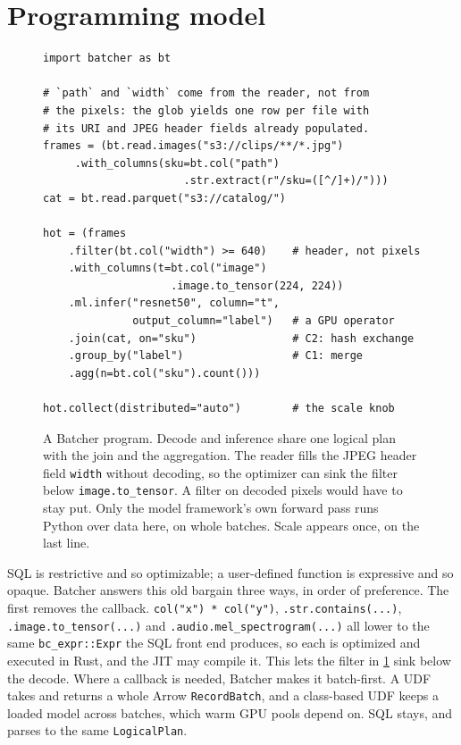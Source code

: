 \documentclass[10pt,twocolumn,letterpaper]{article}   %
\newcommand{\sys}{Batcher}
\begin{document}
\section{Programming model}
\label{sec:interface}

\begin{figure}[tbp]
\begin{lstlisting}
import batcher as bt

# `path` and `width` come from the reader, not from
# the pixels: the glob yields one row per file with
# its URI and JPEG header fields already populated.
frames = (bt.read.images("s3://clips/**/*.jpg")
     .with_columns(sku=bt.col("path")
                      .str.extract(r"/sku=([^/]+)/")))
cat = bt.read.parquet("s3://catalog/")

hot = (frames
    .filter(bt.col("width") >= 640)    # header, not pixels
    .with_columns(t=bt.col("image")
                    .image.to_tensor(224, 224))
    .ml.infer("resnet50", column="t",
              output_column="label")   # a GPU operator
    .join(cat, on="sku")               # C2: hash exchange
    .group_by("label")                 # C1: merge
    .agg(n=bt.col("sku").count()))

hot.collect(distributed="auto")        # the scale knob
\end{lstlisting}
\caption{A \sys{} program. Decode and inference share one logical plan with the join and the
aggregation. The reader fills the JPEG header field \texttt{width} without decoding, so the
optimizer can sink the filter below \texttt{image.to\_tensor}. A filter on decoded pixels would
have to stay put. Only the model framework's own forward pass runs Python over data here, on
whole batches. Scale appears once, on the last line.}
\label{fig:program}
\end{figure}

SQL is restrictive and so optimizable; a user-defined function is expressive and so opaque.
\sys{} answers this old bargain three ways, in order of preference. The first removes the
callback. \texttt{col("x") * col("y")}, \texttt{.str.contains(...)},
\texttt{.image.to\_tensor(...)} and \texttt{.audio.mel\_spectrogram(...)} all lower to the same
\texttt{bc\_expr::Expr} the SQL front end produces, so each is optimized and executed in Rust,
and the JIT may compile it. This lets the filter in \cref{fig:program} sink below the decode.
Where a callback is needed, \sys{} makes it batch-first. A UDF takes and returns a whole Arrow
\texttt{RecordBatch}, and a class-based UDF keeps a loaded model across batches, which warm GPU
pools depend on. SQL stays, and parses to the same \texttt{LogicalPlan}.
\end{document}
